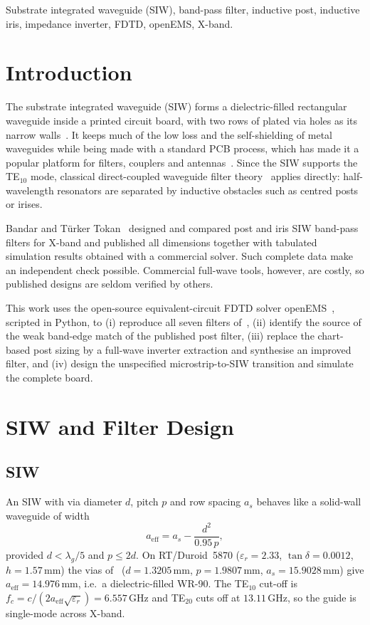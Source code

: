 \documentclass[conference]{IEEEtran}
\newcommand{\SI}[2]{\ensuremath{#1\,\mathrm{#2}}}
\begin{document}
\begin{IEEEkeywords}
Substrate integrated waveguide (SIW), band-pass filter, inductive post, inductive iris, impedance inverter, FDTD, openEMS, X-band.
\end{IEEEkeywords}

\section{Introduction}
The substrate integrated waveguide (SIW) forms a dielectric-filled rectangular waveguide inside a printed circuit board, with two rows of plated via holes as its narrow walls~\cite{deslandes2001,deslandes2003}. It keeps much of the low loss and the self-shielding of metal waveguides while being made with a standard PCB process, which has made it a popular platform for filters, couplers and antennas~\cite{bozzi2011,chen2014}. Since the SIW supports the TE$_{10}$ mode, classical direct-coupled waveguide filter theory~\cite{matthaei1980} applies directly: half-wavelength resonators are separated by inductive obstacles such as centred posts or irises.

Bandar and T\"urker Tokan~\cite{bandar2022} designed and compared post and iris SIW band-pass filters for X-band and published all dimensions together with tabulated simulation results obtained with a commercial solver. Such complete data make an independent check possible. Commercial full-wave tools, however, are costly, so published designs are seldom verified by others.

This work uses the open-source equivalent-circuit FDTD solver openEMS~\cite{liebig2013}, scripted in Python, to (i) reproduce all seven filters of~\cite{bandar2022}, (ii) identify the source of the weak band-edge match of the published post filter, (iii) replace the chart-based post sizing by a full-wave inverter extraction and synthesise an improved filter, and (iv) design the unspecified microstrip-to-SIW transition and simulate the complete board.

\section{SIW and Filter Design}
\subsection{SIW}
An SIW with via diameter $d$, pitch $p$ and row spacing $a_s$ behaves like a solid-wall waveguide of width~\cite{cassivi2002,xu2005}
\begin{equation}
a_\mathrm{eff} = a_s - \frac{d^2}{0.95\,p},
\end{equation}
provided $d<\lambda_g/5$ and $p\le 2d$. On RT/Duroid~5870 ($\varepsilon_r=2.33$, $\tan\delta=0.0012$, $h=\SI{1.57}{mm}$) the vias of~\cite{bandar2022} ($d=\SI{1.3205}{mm}$, $p=\SI{1.9807}{mm}$, $a_s=\SI{15.9028}{mm}$) give $a_\mathrm{eff}=\SI{14.976}{mm}$, i.e.\ a dielectric-filled WR-90. The TE$_{10}$ cut-off is $f_c=c/(2a_\mathrm{eff}\sqrt{\varepsilon_r})=\SI{6.557}{GHz}$ and TE$_{20}$ cuts off at \SI{13.11}{GHz}, so the guide is single-mode across X-band.
\end{document}
